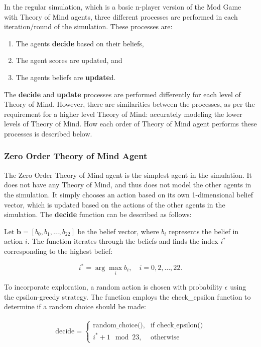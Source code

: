 In the regular simulation, which is a basic n-player version of the Mod Game with Theory of Mind agents, three different processes are performed in each iteration/round of the simulation. These processes are:
\begin{enumerate}
    \item The agents \textbf{decide} based on their beliefs,
    \item The agent scores are updated, and
    \item The agents beliefs are \textbf{update}d.
\end{enumerate}

The \textbf{decide} and \textbf{update} processes are performed differently for each level of Theory of Mind. However, there are similarities between the processes, as per the requirement for a higher level Theory of Mind: accurately modeling the lower levels of Theory of Mind. How each order of Theory of Mind agent performs these processes is described below.

\subsubsection{Zero Order Theory of Mind Agent}

The Zero Order Theory of Mind agent is the simplest agent in the simulation. It does not have any Theory of Mind, and thus does not model the other agents in the simulation. It simply chooses an action based on its own 1-dimensional belief vector, which is updated based on the actions of the other agents in the simulation. The \textbf{decide} function can be described as follows:

Let $\mathbf{b} = [b_0, b_1, \ldots, b_{22}]$ be the belief vector, where $b_i$ represents the belief in action $i$. The function iterates through the beliefs and finds the index $i^*$ corresponding to the highest belief:

\[
i^* = \arg\max_i b_i, \quad i = 0, 2, \ldots, 22.
\]

To incorporate exploration, a random action is chosen with probability $\epsilon$ using the epsilon-greedy strategy. The function employs the check\_epsilon function to determine if a random choice should be made:

\[
\begin{aligned}
\text{{decide}} =
\begin{cases}
\text{{random\_choice()}}, & \text{{if }} \text{{check\_epsilon()}} \\
i^* + 1 \mod 23, & \text{{otherwise}}
\end{cases}
\end{aligned}
\]

